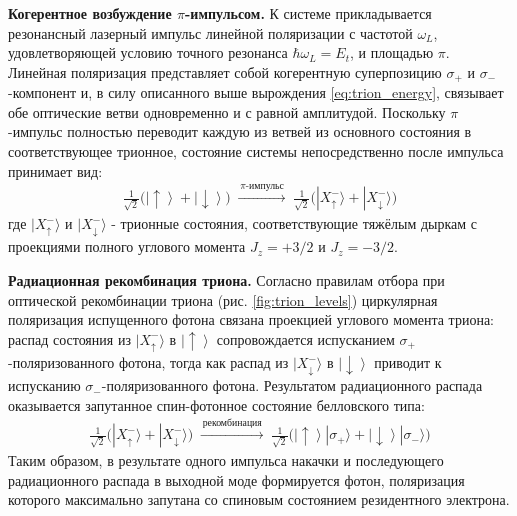 \documentclass[11pt]{article}    %
\numberwithin{equation}{section}
\begin{document}
\textbf{Когерентное возбуждение $\pi$-импульсом.} К системе
прикладывается резонансный лазерный импульс линейной поляризации с частотой
$\omega_L$, удовлетворяющей условию точного резонанса
$\hbar\omega_L = E_t$, и площадью $\pi$.
Линейная поляризация представляет собой когерентную суперпозицию
$\sigma_+$ и $\sigma_-$-компонент и, в силу описанного выше
вырождения \eqref{eq:trion_energy}, связывает обе оптические ветви одновременно и с равной
амплитудой. Поскольку $\pi$-импульс полностью переводит каждую из ветвей
из основного состояния в соответствующее трионное, состояние системы
непосредственно после импульса принимает вид:
\begin{gather}
    \frac{1}{\sqrt{2}}\bigl(\left|\uparrow\right\rangle
    + \left|\downarrow\right\rangle\bigr)
    \;\xrightarrow{\,\pi\text{-импульс}\,}\;
    \frac{1}{\sqrt{2}}\bigl(|X^-_{\uparrow}\rangle
    + |X^-_{\downarrow}\rangle\bigr)
    \label{eq:LR_step1}
\end{gather}
где $|X^-_{\uparrow}\rangle$ и $|X^-_{\downarrow}\rangle$
- трионные состояния, соответствующие тяжёлым дыркам с проекциями полного углового
момента $J_z = +3/2$ и $J_z = -3/2$.

\textbf{Радиационная рекомбинация триона.}
Согласно правилам отбора при оптической рекомбинации триона (рис. \ref{fig:trion_levels})
циркулярная поляризация испущенного фотона связана проекцией углового
момента триона: распад состояния из $|X^-_{\uparrow}\rangle$ в
$\left|\uparrow\right\rangle$
сопровождается испусканием $\sigma_+$-поляризованного фотона, тогда как
распад из $|X^-_{\downarrow}\rangle$ в $\left|\downarrow\right\rangle$
приводит к испусканию $\sigma_-$-поляризованного фотона.
Результатом радиационного распада оказывается запутанное спин-фотонное
состояние белловского типа:
\begin{gather}
    \frac{1}{\sqrt{2}}\bigl(|X^-_{\uparrow}\rangle
    + |X^-_{\downarrow}\rangle\bigr)
    \;\xrightarrow{\,\text{рекомбинация}\,}\;
    \frac{1}{\sqrt{2}}\bigl(\left|\uparrow\right\rangle|\sigma_+\rangle
    + \left|\downarrow\right\rangle|\sigma_-\rangle\bigr)
    \label{eq:LR_step2}
\end{gather}
Таким образом, в результате одного импульса накачки и последующего
радиационного распада в выходной моде формируется фотон, поляризация
которого максимально запутана со спиновым состоянием резидентного
электрона.
\end{document}

